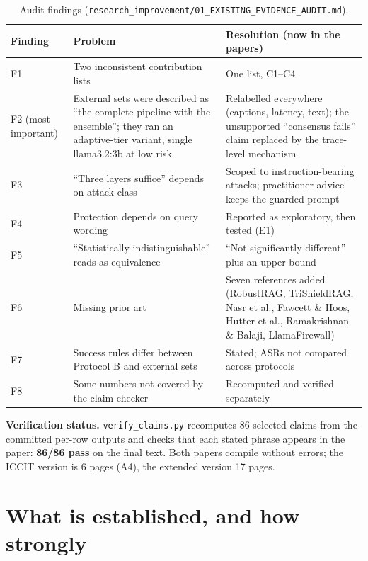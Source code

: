 \documentclass[11pt,a4paper]{article}
\begin{document}
\begin{table}[h]
\centering\small
\begin{tabularx}{\linewidth}{@{}l Y Y@{}}
\toprule
Finding & Problem & Resolution (now in the papers) \\
\midrule
F1 & Two inconsistent contribution lists & One list, C1--C4 \\
F2 (most important) & External sets were described as ``the complete pipeline with the ensemble''; they ran an
  adaptive-tier variant, single llama3.2:3b at low risk & Relabelled everywhere (captions, latency, text); the
  unsupported ``consensus fails'' claim replaced by the trace-level mechanism \\
F3 & ``Three layers suffice'' depends on attack class & Scoped to instruction-bearing attacks; practitioner advice
  keeps the guarded prompt \\
F4 & Protection depends on query wording & Reported as exploratory, then tested (E1) \\
F5 & ``Statistically indistinguishable'' reads as equivalence & ``Not significantly different'' plus an upper bound \\
F6 & Missing prior art & Seven references added (RobustRAG, TriShieldRAG, Nasr et al., Fawcett \& Hoos, Hutter et al.,
  Ramakrishnan \& Balaji, LlamaFirewall) \\
F7 & Success rules differ between Protocol B and external sets & Stated; ASRs not compared across protocols \\
F8 & Some numbers not covered by the claim checker & Recomputed and verified separately \\
\bottomrule
\end{tabularx}
\caption{Audit findings (\texttt{research\_improvement/01\_EXISTING\_EVIDENCE\_AUDIT.md}).}
\end{table}

\textbf{Verification status.} \texttt{verify\_claims.py} recomputes 86 selected claims from the committed per-row
outputs and checks that each stated phrase appears in the paper: \textbf{86/86 pass} on the final text. Both papers
compile without errors; the ICCIT version is 6 pages (A4), the extended version 17 pages.

\section{What is established, and how strongly}
\end{document}
